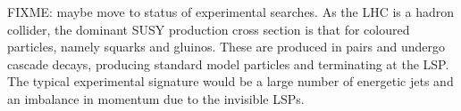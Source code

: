 FIXME: maybe move to status of experimental searches.
As the LHC is a hadron collider, the dominant SUSY production cross section is 
that for coloured particles, namely squarks and gluinos. These are produced in 
pairs and undergo cascade decays, producing standard model particles and 
terminating at the LSP. The typical experimental signature would be a large 
number of energetic jets and an imbalance in momentum due to the invisible LSPs.







